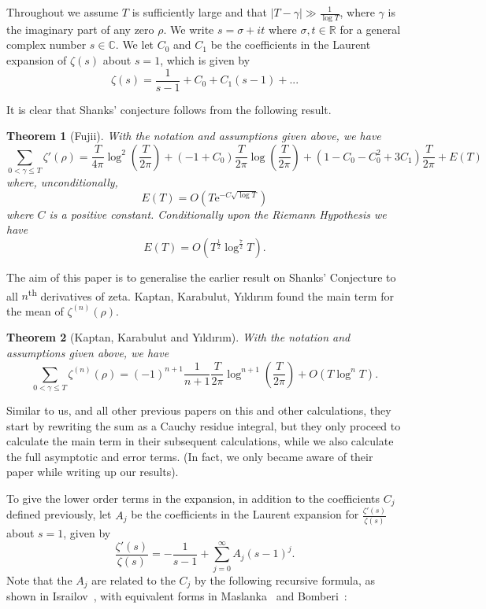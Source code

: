 \documentclass[12pt,a4paper,reqno]{amsart}
\newtheorem{theorem}{Theorem}
\theoremstyle{remark}
\numberwithin{equation}{section}
\begin{document}
Throughout we assume $T$ is sufficiently large and that $|T-\gamma| \gg \frac{1}{\log T}$, where $\gamma$ is the imaginary part of any zero $\rho$. We write $s= \sigma + it$ where $\sigma, t \in \mathbb{R}$ for a general complex number $s \in \mathbb{C}$. We let $C_0$ and $C_1$ be the coefficients in the Laurent expansion of $\zeta (s)$ about $s=1$, which is given by
\[
\zeta(s) = \frac{1}{s-1} + C_0 + C_1 (s-1) + ...
\]

It is clear that Shanks' conjecture follows from the following result.
\begin{theorem}[Fujii] \label{Shanks' Conjecture}
With the notation and assumptions given above, we have
\begin{equation*}
\sum_{0 < \gamma \leq T} \zeta' (\rho) = \frac{T}{4 \pi} \log ^2 \left( \frac{T}{2 \pi} \right) + (-1 + C_0) \frac{T}{2 \pi} \log \left( \frac{T}{2 \pi} \right) + (1 - C_0 - C_0^2 + 3 C_1) \frac{T}{2 \pi} +E(T)
\end{equation*}
where, unconditionally,
\[
E(T) = O \left(T \mathrm{e}^{-C \sqrt{\log T}} \right)
\]
where $C$ is a positive constant. Conditionally upon the Riemann Hypothesis we have
\[
E(T) = O \left(T^{\frac{1}{2}} \log ^{\frac{7}{2}} T \right).
\]
\end{theorem}

The aim of this paper is to generalise the earlier result on Shanks' Conjecture to all $n$\textsuperscript{th} derivatives of zeta. Kaptan, Karabulut, Y{\i}ld{\i}r{\i}m  \cite{KKY} found the main term for the mean of $\zeta^{(n)}(\rho)$.
\begin{theorem}[Kaptan, Karabulut and Y{\i}ld{\i}r{\i}m] \label{KKY}
With the notation and assumptions given above, we have
\begin{equation*}
\sum_{0 < \gamma \leq T} \zeta^{(n)} (\rho) =
 (-1)^{n+1} \frac{1}{n+1} \frac{T}{2 \pi} \log^{n+1} \left( \frac{T}{2 \pi} \right) + O (T \log^{n} T).
\end{equation*}
\end{theorem}

Similar to us, and all other previous papers on this and other calculations, they start by rewriting the sum as a Cauchy residue integral, but they only proceed to calculate the main term in their subsequent calculations, while we also calculate the full asymptotic and error terms. (In fact, we only became aware of their paper while writing up our results).


To give the lower order terms in the expansion, in addition to the coefficients $C_j$ defined previously, let $A_j$ be the coefficients in the Laurent expansion for $\frac{\zeta' (s)}{\zeta (s)}$ about $s=1$, given by
\[
\frac{\zeta' (s)}{\zeta (s)} = - \frac{1}{s-1} + \sum_{j=0}^\infty A_j (s-1)^j.
\]
Note that the $A_j$ are related to the $C_j$ by the following recursive formula, as shown in Israilov~\cite{LaurentZetaPrime}, with equivalent forms in Maslanka~\cite{LiCoefficients} and Bomberi~\cite{Bombieri}:
\end{document}
